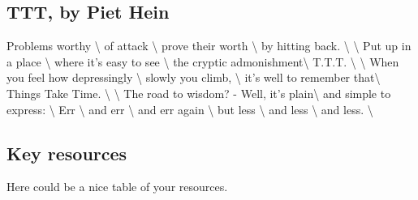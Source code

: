 \documentclass[9pt,biorxiv,doublespacing,lineno]{lapreprint}
\begin{document}
\begin{appendix}
  \begin{appendixbox}
  \section{TTT, by Piet Hein}

  Problems worthy \textbackslash{} of attack \textbackslash{} prove their
  worth \textbackslash{} by hitting back. \textbackslash{}
  \textbackslash{} Put up in a place \textbackslash{} where it's easy to
  see \textbackslash{} the cryptic admonishment\textbackslash{} T.T.T.
  \textbackslash{} \textbackslash{} When you feel how depressingly
  \textbackslash{} slowly you climb, \textbackslash{} it's well to
  remember that\textbackslash{} Things Take Time. \textbackslash{}
  \textbackslash{} The road to wisdom? - Well, it's plain\textbackslash{}
  and simple to express: \textbackslash{} Err \textbackslash{} and err
  \textbackslash{} and err again \textbackslash{} but less
  \textbackslash{} and less \textbackslash{} and less. \textbackslash{}
  \end{appendixbox}
  \begin{appendixbox}
  \section{Key resources}

  Here could be a nice table of your resources.
  \end{appendixbox}\end{appendix}




\end{document}
